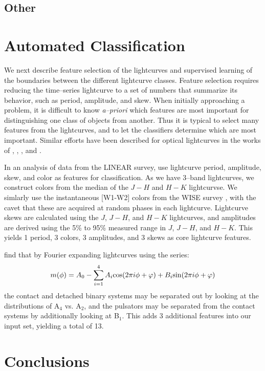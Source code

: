 \documentclass[]{emulateapj}
\begin{document}
\subsection{Other}

\section{Automated Classification}

We next describe feature selection of the lightcurves and supervised
learning of the boundaries between the different lightcurve classes.
Feature selection requires reducing the time--series lightcurve to a
set of numbers that summarize its behavior, such as period, amplitude,
and skew.  When initially approaching a problem, it is difficult to
know {\it a--priori} which features are most important for
distinguishing one class of objects from another.  Thus it is typical
to select many features from the lightcurves, and to let the
classifiers determine which are most important.  Similar efforts have
been described for optical lightcurves in the works of
\cite{2008AN....329..288M}, \cite{2011ApJ...733...10R},
\cite{2012MNRAS.427.2917R}, and \cite{LINEAR-3}.

In an analysis of data from the LINEAR survey, \cite{LINEAR-3} use
lightcurve period, amplitude, skew, and color as features for
classification.  As we have 3--band lightcurves, we construct colors
from the median of the $J-H$ and $H-K$ lightcurvse.  We simlarly use
the instantaneous [W1-W2] colors from the WISE survey \cite{wise},
with the cavet that these are acquired at random phases in each
lightcurve.  Lightcurve skews are calculated using the $J$, $J-H$, and
$H-K$ lightcurves, and amplitudes are derived using the 5\% to 95\%
measured range in $J$, $J-H$, and $H-K$.  This yields 1 period, 3
colors, 3 amplitudes, and 3 skews as core lightcurve features.

\cite{asas} find that by Fourier expanding lightcurves using the
series:
\[m(\phi) = A_0 - \sum_{i=1}^4 A_i {\rm cos}(2 \pi i \phi + \varphi) + B_i {\rm sin}(2 \pi i \phi + \varphi)\]
the contact and detached binary systems may be separated out by
looking at the distributions of A$_4$ vs. A$_2$, and the pulsators may
be separated from the contact systems by additionally looking at
B$_1$.  This adds 3 additional features into our input set, yielding a
total of 13.


\section{Conclusions}
\end{document}
